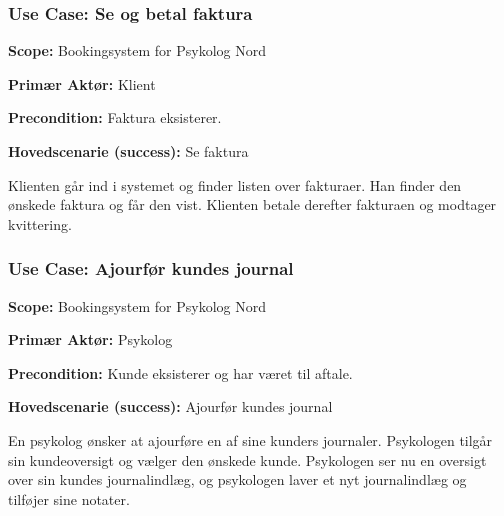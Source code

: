 \subsubsection{Use Case: Se og betal faktura}
{\setlength{\parindent}{0cm}
\textbf{Scope:} Bookingsystem for Psykolog Nord

\textbf{Primær Aktør:} Klient

\textbf{Precondition:} Faktura eksisterer.

\textbf{Hovedscenarie (success):} Se faktura

Klienten går ind i systemet og finder listen over fakturaer. 
Han finder den ønskede faktura og får den vist. Klienten betale derefter fakturaen og modtager kvittering.
}

\subsubsection{Use Case: Ajourfør kundes journal}
{\setlength{\parindent}{0cm}
\textbf{Scope:} Bookingsystem for Psykolog Nord

\textbf{Primær Aktør:} Psykolog

\textbf{Precondition:} Kunde eksisterer og har været til aftale.

\textbf{Hovedscenarie (success):} Ajourfør kundes journal

En psykolog ønsker at ajourføre en af sine kunders journaler.
Psykologen tilgår sin kundeoversigt og vælger den ønskede kunde.
Psykologen ser nu en oversigt over sin kundes journalindlæg, og psykologen laver et nyt journalindlæg og tilføjer sine notater.
}
